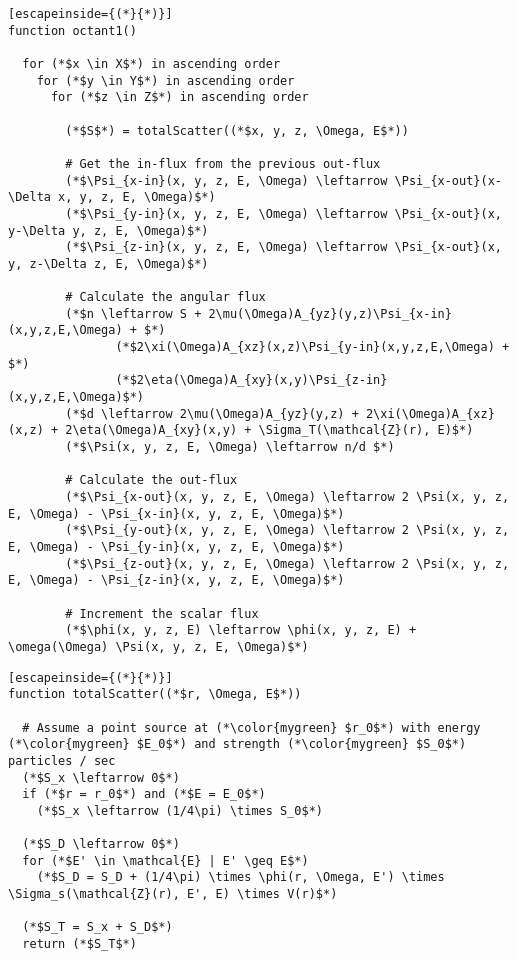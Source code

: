 \documentclass{article}
\numberwithin{equation}{subsection}
\begin{document}
\pagebreak
\begin{lstlisting}[escapeinside={(*}{*)}]
function octant1()

  for (*$x \in X$*) in ascending order
    for (*$y \in Y$*) in ascending order
      for (*$z \in Z$*) in ascending order
            
        (*$S$*) = totalScatter((*$x, y, z, \Omega, E$*))            
            
        # Get the in-flux from the previous out-flux
        (*$\Psi_{x-in}(x, y, z, E, \Omega) \leftarrow \Psi_{x-out}(x-\Delta x, y, z, E, \Omega)$*)
        (*$\Psi_{y-in}(x, y, z, E, \Omega) \leftarrow \Psi_{x-out}(x, y-\Delta y, z, E, \Omega)$*)
        (*$\Psi_{z-in}(x, y, z, E, \Omega) \leftarrow \Psi_{x-out}(x, y, z-\Delta z, E, \Omega)$*)
              
        # Calculate the angular flux
        (*$n \leftarrow S + 2\mu(\Omega)A_{yz}(y,z)\Psi_{x-in}(x,y,z,E,\Omega) + $*)
               (*$2\xi(\Omega)A_{xz}(x,z)\Psi_{y-in}(x,y,z,E,\Omega) + $*)
               (*$2\eta(\Omega)A_{xy}(x,y)\Psi_{z-in}(x,y,z,E,\Omega)$*)
        (*$d \leftarrow 2\mu(\Omega)A_{yz}(y,z) + 2\xi(\Omega)A_{xz}(x,z) + 2\eta(\Omega)A_{xy}(x,y) + \Sigma_T(\mathcal{Z}(r), E)$*)
        (*$\Psi(x, y, z, E, \Omega) \leftarrow n/d $*)
              
        # Calculate the out-flux
        (*$\Psi_{x-out}(x, y, z, E, \Omega) \leftarrow 2 \Psi(x, y, z, E, \Omega) - \Psi_{x-in}(x, y, z, E, \Omega)$*)
        (*$\Psi_{y-out}(x, y, z, E, \Omega) \leftarrow 2 \Psi(x, y, z, E, \Omega) - \Psi_{y-in}(x, y, z, E, \Omega)$*)
        (*$\Psi_{z-out}(x, y, z, E, \Omega) \leftarrow 2 \Psi(x, y, z, E, \Omega) - \Psi_{z-in}(x, y, z, E, \Omega)$*)
            
        # Increment the scalar flux
        (*$\phi(x, y, z, E) \leftarrow \phi(x, y, z, E) + \omega(\Omega) \Psi(x, y, z, E, \Omega)$*)
\end{lstlisting}

\pagebreak
\begin{lstlisting}[escapeinside={(*}{*)}]
function totalScatter((*$r, \Omega, E$*))

  # Assume a point source at (*\color{mygreen} $r_0$*) with energy (*\color{mygreen} $E_0$*) and strength (*\color{mygreen} $S_0$*) particles / sec
  (*$S_x \leftarrow 0$*)
  if (*$r = r_0$*) and (*$E = E_0$*)
    (*$S_x \leftarrow (1/4\pi) \times S_0$*)

  (*$S_D \leftarrow 0$*)
  for (*$E' \in \mathcal{E} | E' \geq E$*)
    (*$S_D = S_D + (1/4\pi) \times \phi(r, \Omega, E') \times \Sigma_s(\mathcal{Z}(r), E', E) \times V(r)$*)
    
  (*$S_T = S_x + S_D$*)
  return (*$S_T$*)
\end{lstlisting}
\end{document}
